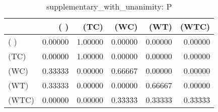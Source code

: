 \begin{table}
\centering
\caption{supplementary_with_unanimity: P}
\begin{tabular}{lrrrrr}
\toprule
{} &     ( ) &    (TC) &    (WC) &    (WT) &   (WTC) \\
\midrule
( )   & 0.00000 & 1.00000 & 0.00000 & 0.00000 & 0.00000 \\
(TC)  & 0.00000 & 1.00000 & 0.00000 & 0.00000 & 0.00000 \\
(WC)  & 0.33333 & 0.00000 & 0.66667 & 0.00000 & 0.00000 \\
(WT)  & 0.33333 & 0.00000 & 0.00000 & 0.66667 & 0.00000 \\
(WTC) & 0.00000 & 0.00000 & 0.33333 & 0.33333 & 0.33333 \\
\bottomrule
\end{tabular}
\end{table}
